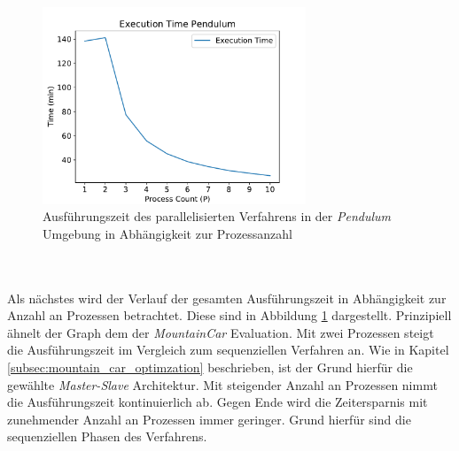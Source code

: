 \begin{figure}[!htb]
	\centering
	\includegraphics[width=0.7\textwidth]{./img/pendulum_analysis/pendulum_execution_1_1_10.pdf} 
	\caption{Ausführungszeit des parallelisierten Verfahrens in der \emph{Pendulum} Umgebung in Abhängigkeit zur Prozessanzahl}
	\label{fig:pendulum_execution_time_1_10}
\end{figure}
\\\\
Als nächstes wird der Verlauf der gesamten Ausführungszeit in Abhängigkeit zur Anzahl an Prozessen betrachtet. Diese sind in Abbildung \ref{fig:pendulum_execution_time_1_10} dargestellt. Prinzipiell ähnelt der Graph dem der \emph{MountainCar} Evaluation. Mit zwei Prozessen steigt die Ausführungszeit im Vergleich zum sequenziellen Verfahren an. Wie in Kapitel \ref{subsec:mountain_car_optimzation} beschrieben, ist der Grund hierfür die gewählte \emph{Master-Slave} Architektur. Mit steigender Anzahl an Prozessen nimmt die Ausführungszeit kontinuierlich ab. Gegen Ende wird die Zeitersparnis mit zunehmender Anzahl an Prozessen immer geringer. Grund hierfür sind die sequenziellen Phasen des Verfahrens. 
